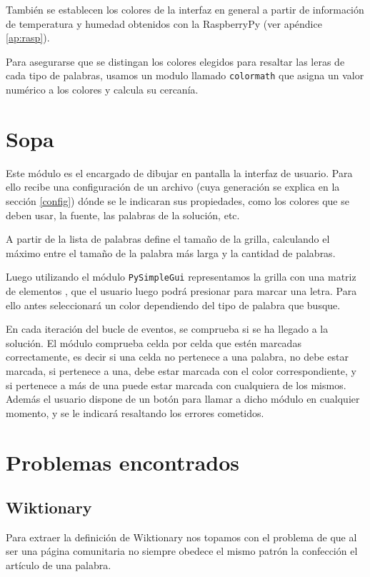 También se establecen los colores de la interfaz en general a partir de información de temperatura y humedad obtenidos con la RaspberryPy (ver apéndice \ref{ap:rasp}).

Para asegurarse que se distingan los colores elegidos para resaltar las leras de cada tipo de palabras, usamos un modulo llamado \texttt{colormath} que asigna un valor numérico a los colores y calcula su cercanía.

\section{Sopa}\label{sopa}
Este módulo es el encargado de dibujar en pantalla la interfaz de usuario. Para ello recibe una configuración de un archivo (cuya generación se explica en la sección \ref{config}) dónde se le indicaran sus propiedades, como los colores que se deben usar, la fuente, las palabras de la solución, etc.

A partir de la lista de palabras define el tamaño de la grilla, calculando el máximo entre el tamaño de la palabra más larga y la cantidad de palabras.

Luego utilizando el módulo \texttt{PySimpleGui} representamos la grilla con una matriz de elementos , que el usuario luego podrá presionar para marcar una letra. Para ello antes seleccionará un color dependiendo del tipo de palabra que busque.

En cada iteración del bucle de eventos, se comprueba si se ha llegado a la solución. El módulo  comprueba celda por celda que estén marcadas correctamente, es decir si una celda no pertenece a una palabra, no debe estar marcada, si pertenece a una, debe estar marcada con el color correspondiente, y si pertenece a más de una puede estar marcada con cualquiera de los mismos. Además el usuario dispone de un botón para llamar a dicho módulo en cualquier momento, y se le indicará resaltando los errores cometidos.

\section{Problemas encontrados}
\subsection{Wiktionary}\label{wik}
Para extraer la definición de Wiktionary nos topamos con el problema de que al ser una página comunitaria no siempre obedece el mismo patrón la confección el artículo de una palabra. 

